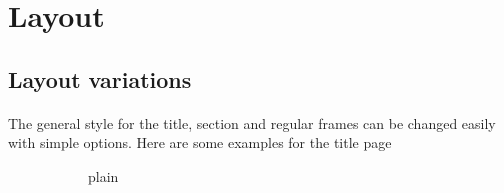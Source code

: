 \begin{frame}[fragile=singleslide]{\insertsectionhead}
  \framesubtitle{\insertsubsectionhead}
\end{frame}

\section{Layout}

\subsection{Layout variations}

\begin{frame}[fragile=singleslide]{\insertsectionhead}
  \framesubtitle{\insertsubsectionhead}
  The general style for the title, section and regular frames can be changed
  easily with simple options. Here are some examples for the title page
  \begin{figure}[ht!]
    \begin{subfigure}[b]{0.3\textwidth}
      \caption*{plain}
    \end{subfigure}
    \hspace{\fill}
    \begin{subfigure}[b]{0.3\textwidth}

\end{subfigure}
\end{figure}
\end{frame}
